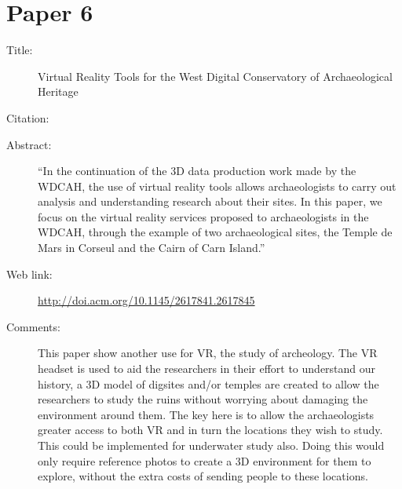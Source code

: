 \documentclass{scrartcl}
\begin{document}
	\section*{Paper 6}
	\begin{description}
		\item[Title:] Virtual Reality Tools for the West Digital Conservatory of Archaeological Heritage
		\item[Citation:] \cite{Barreau}
		\item[Abstract:] ``In the continuation of the 3D data production work made by the WDCAH, the use of virtual reality tools allows archaeologists to carry out analysis and understanding research about their sites. In this paper, we focus on the virtual reality services proposed to archaeologists in the WDCAH, through the example of two archaeological sites, the Temple de Mars in Corseul and the Cairn of Carn Island.''
		\item[Web link:] \url{http://doi.acm.org/10.1145/2617841.2617845}
		\item[Comments:]This paper show another use for VR, the study of archeology. The VR headset is used to aid the researchers in their effort to understand our history, a 3D model of digsites and/or temples are created to allow the researchers to study the ruins without worrying about damaging the environment around them. The key here is to allow the archaeologists greater access to both VR and in turn the locations they wish to study. This could be implemented for underwater study also. Doing this would only require reference photos to create a 3D environment for them to explore, without the extra costs of sending people to these locations.
	\end{description}
	
\end{document}
